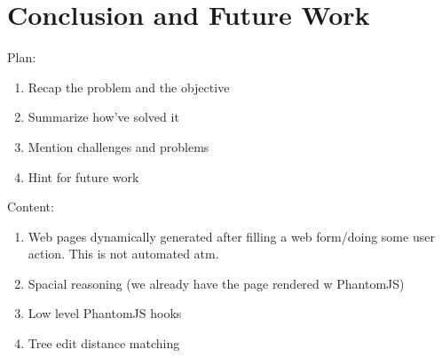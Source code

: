 \section{Conclusion and Future Work}
Plan:
\begin{enumerate}
  \item Recap the problem and the objective
  \item Summarize how've solved it
  \item Mention challenges and problems
  \item Hint for future work
\end{enumerate}

Content:
\begin{enumerate}
  \item Web pages dynamically generated after filling a web form/doing some user action. This is not automated atm.
  \item Spacial reasoning (we already have the page rendered w PhantomJS)
  \item Low level PhantomJS hooks
  \item Tree edit distance matching
\end{enumerate}
